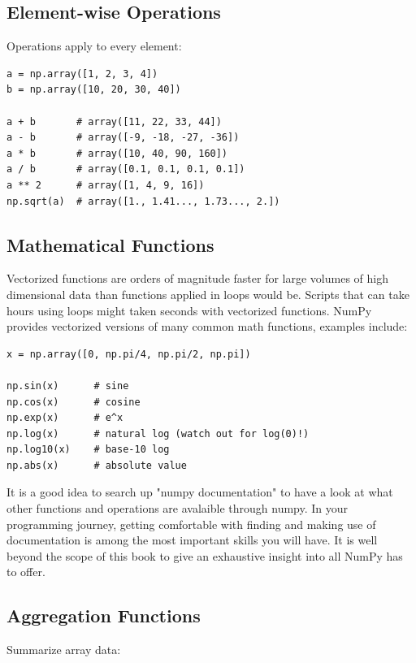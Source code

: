 \subsection{Element-wise Operations}

Operations apply to every element:

\begin{lstlisting}
a = np.array([1, 2, 3, 4])
b = np.array([10, 20, 30, 40])

a + b       # array([11, 22, 33, 44])
a - b       # array([-9, -18, -27, -36])
a * b       # array([10, 40, 90, 160])
a / b       # array([0.1, 0.1, 0.1, 0.1])
a ** 2      # array([1, 4, 9, 16])
np.sqrt(a)  # array([1., 1.41..., 1.73..., 2.])
\end{lstlisting}

\subsection{Mathematical Functions}

Vectorized functions are orders of magnitude faster for large volumes of high dimensional data than functions applied in loops would be. Scripts that can take hours using loops might taken seconds with vectorized functions. NumPy provides vectorized versions of many common math functions, examples include: 

\begin{lstlisting}
x = np.array([0, np.pi/4, np.pi/2, np.pi])

np.sin(x)      # sine
np.cos(x)      # cosine
np.exp(x)      # e^x
np.log(x)      # natural log (watch out for log(0)!)
np.log10(x)    # base-10 log
np.abs(x)      # absolute value
\end{lstlisting}

\begin{tip}
It is a good idea to search up "numpy documentation" to have a look at what other functions and operations are avalaible through numpy. In your programming journey, getting comfortable with finding and making use of documentation is among the most important skills you will have. It is well beyond the scope of this book to give an exhaustive insight into all NumPy has to offer.
\end{tip}

\subsection{Aggregation Functions}

Summarize array data:

